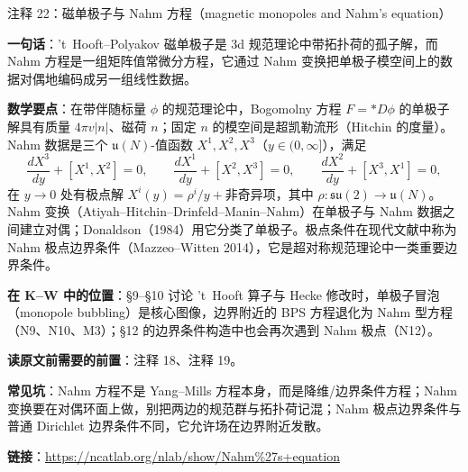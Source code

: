 \begin{kcard}{注释 22：磁单极子与 Nahm 方程（magnetic monopoles and Nahm's equation）}

\textbf{一句话}：'t~Hooft--Polyakov 磁单极子是 3d 规范理论中带拓扑荷的孤子解，而 Nahm 方程是一组矩阵值常微分方程，它通过 Nahm 变换把单极子模空间上的数据对偶地编码成另一组线性数据。

\textbf{数学要点}：在带伴随标量 $\phi$ 的规范理论中，Bogomolny 方程 $F=*D\phi$ 的单极子解具有质量 $4\pi v|n|$、磁荷 $n$；固定 $n$ 的模空间是超凯勒流形（Hitchin 的度量）。Nahm 数据是三个 $\mathfrak{u}(N)$-值函数 $X^1,X^2,X^3$（$y\in(0,\infty]$），满足
\[
\frac{dX^3}{dy}+[X^1,X^2]=0,\qquad
\frac{dX^1}{dy}+[X^2,X^3]=0,\qquad
\frac{dX^2}{dy}+[X^3,X^1]=0,
\]
在 $y\to0$ 处有极点解 $X^i(y)=\rho^i/y+\text{非奇异项}$，其中 $\rho:\mathfrak{su}(2)\to\mathfrak{u}(N)$。Nahm 变换（Atiyah--Hitchin--Drinfeld--Manin--Nahm）在单极子与 Nahm 数据之间建立对偶；Donaldson（1984）用它分类了单极子。极点条件在现代文献中称为 Nahm 极点边界条件（Mazzeo--Witten 2014），它是超对称规范理论中一类重要边界条件。

\textbf{在 K--W 中的位置}：§9--§10 讨论 't~Hooft 算子与 Hecke 修改时，单极子冒泡（monopole bubbling）是核心图像，边界附近的 BPS 方程退化为 Nahm 型方程（N9、N10、M3）；§12 的边界条件构造中也会再次遇到 Nahm 极点（N12）。

\textbf{读原文前需要的前置}：注释 18、注释 19。

\textbf{常见坑}：Nahm 方程不是 Yang--Mills 方程本身，而是降维/边界条件方程；Nahm 变换要在对偶环面上做，别把两边的规范群与拓扑荷记混；Nahm 极点边界条件与普通 Dirichlet 边界条件不同，它允许场在边界附近发散。

\noindent\textbf{链接}：\url{https://ncatlab.org/nlab/show/Nahm%27s+equation}
\end{kcard}

